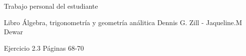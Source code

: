 \documentclass[aspectratio=169,10pt,handout]{beamer}
\begin{document}
	\begin{frame}{Trabajo personal del estudiante}

	\centering

	\vspace{0.3cm}

	Libro Álgebra, trigonometría y geometría análitica
	Dennis G. Zill - Jaqueline.M Dewar
	
	\medskip
	
	Ejercicio 2.3 Páginas 68-70	

	\end{frame}	
	
\end{document}
